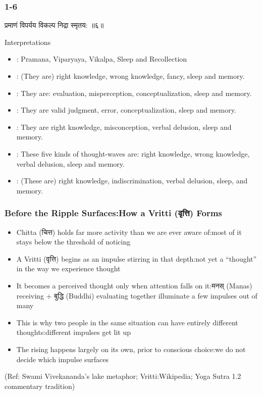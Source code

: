 \begin{frame}[fragile]\frametitle{1-6}

\begin{sanskrit}
 प्रमाणं विपर्यय विकल्प निद्रा स्मृतय: ॥६॥
\end{sanskrit}


Interpretations
\begin{itemize}	
\item [HA]: Pramana, Viparyaya, Vikalpa, Sleep and Recollection
\item [IT]: (They are) right knowledge, wrong knowledge, fancy, sleep and memory.
\item [VH]: They are: evaluation, misperception, conceptualization, sleep and memory.
\item [BM]: They are valid judgment, error, conceptualization, sleep and memory.
\item [SS]: They are right knowledge, misconception, verbal delusion, sleep and memory.
\item [SP]: These five kinds of thought-waves are: right knowledge, wrong knowledge, verbal delusion, sleep and memory.
\item [SV]: (These are) right knowledge, indiscrimination, verbal delusion, sleep, and memory.
\end{itemize}	

\end{frame}

\begin{frame}[fragile]\frametitle{Before the Ripple Surfaces:How a Vritti (वृत्ति) Forms}

\begin{itemize}
\item Chitta (चित्त) holds far more activity than we are ever aware of:most of it stays below the threshold of noticing
\item A Vritti (वृत्ति) begins as an impulse stirring in that depth:not yet a ``thought'' in the way we experience thought
\item It becomes a perceived thought only when attention falls on it:मनस् (Manas) receiving + बुद्धि (Buddhi) evaluating together illuminate a few impulses out of many
\item This is why two people in the same situation can have entirely different thoughts:different impulses get lit up
\item The rising happens largely on its own, prior to conscious choice:we do not decide which impulse surfaces
\end{itemize}

\tiny{(Ref: Swami Vivekananda's lake metaphor; Vritti:Wikipedia; Yoga Sutra 1.2 commentary tradition)}

\end{frame}

